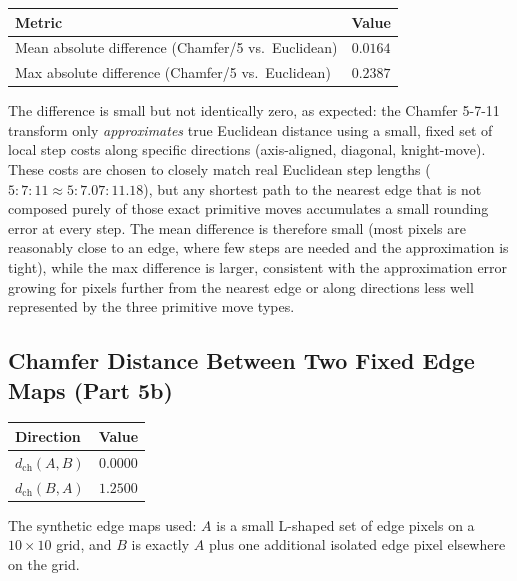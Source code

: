 \documentclass[11pt]{article}
\begin{document}
\begin{center}
\begin{tabular}{lc}
\toprule
Metric & Value \\
\midrule
Mean absolute difference (Chamfer/5 vs.\ Euclidean) & $0.0164$ \\
Max absolute difference (Chamfer/5 vs.\ Euclidean) & $0.2387$ \\
\bottomrule
\end{tabular}
\end{center}

The difference is small but not identically zero, as expected: the Chamfer 5-7-11 transform
only \emph{approximates} true Euclidean distance using a small, fixed set of local step costs
along specific directions (axis-aligned, diagonal, knight-move). These costs are chosen to
closely match real Euclidean step lengths ($5:7:11 \approx 5:7.07:11.18$), but any shortest
path to the nearest edge that is not composed purely of those exact primitive moves
accumulates a small rounding error at every step. The mean difference is therefore small
(most pixels are reasonably close to an edge, where few steps are needed and the
approximation is tight), while the max difference is larger, consistent with the
approximation error growing for pixels further from the nearest edge or along directions
less well represented by the three primitive move types.

\subsection{Chamfer Distance Between Two Fixed Edge Maps (Part 5b)}

\begin{center}
\begin{tabular}{lc}
\toprule
Direction & Value \\
\midrule
$d_{\text{ch}}(A,B)$ & $0.0000$ \\
$d_{\text{ch}}(B,A)$ & $1.2500$ \\
\bottomrule
\end{tabular}
\end{center}

The synthetic edge maps used: $A$ is a small L-shaped set of edge pixels on a $10\times10$
grid, and $B$ is exactly $A$ plus one additional isolated edge pixel elsewhere on the grid.
\end{document}

